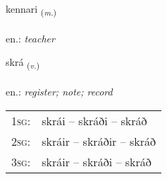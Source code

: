 \documentclass[frontgrid, backgrid]{flacards}\usepackage[]{graphicx}\usepackage[]{xcolor}
\begin{document}
\renewcommand{\blhead}{\vskip5pt {\small\bfseries\footnotesize Nafnorð | Noun }}
\renewcommand{\bcfoot}{\vskip5pt \hspace{2pt}{\small\bfseries\footnotesize 1K}}


{kennari \small{\textsubscript{(\textit{m.})}} \\[1ex] %
\textphonetic{[cʰɛnarɪ]} \\
en.: \emph{teacher} \\  [2ex]
\renewcommand*{\arraystretch}{0.8}
}

\renewcommand{\flhead}{\vskip5pt \fboxsep=0pt {\small\bfseries\footnotesize Sagnorð | Verb}}
\renewcommand{\fcfoot}{\vskip5pt \fboxsep=0pt \hspace{2pt}{\small\bfseries\footnotesize 1K}}

\renewcommand{\blhead}{\vskip5pt {\small\bfseries\footnotesize Sagnorð | Verb }}
\renewcommand{\bcfoot}{\vskip5pt \hspace{2pt}{\small\bfseries\footnotesize 1K}}


{skrá \small{\textsubscript{(\textit{v.})}} \\[1ex] %
\textphonetic{[skrauː]} \\
en.: \emph{register; note; record} \\  [2ex]
\renewcommand*{\arraystretch}{0.8}
\begin{tabular}{p{1cm}l}
\textsc{1sg}: & skrái -- skráði -- skráð \\ 
\textsc{2sg}: & skráir -- skráðir -- skráð \\ 
\textsc{3sg}: & skráir -- skráði -- skráð \\ 
\end{tabular}
}

\renewcommand{\flhead}{\vskip5pt \fboxsep=0pt {\small\bfseries\footnotesize Nafnorð | Noun}}
\renewcommand{\fcfoot}{\vskip5pt \fboxsep=0pt \hspace{2pt}{\small\bfseries\footnotesize 1K}}
\end{document}
